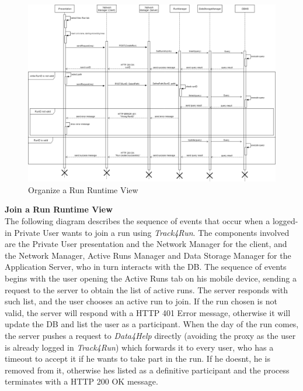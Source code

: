 \documentclass[titlepage]{article}
\begin{document}
	\begin{figure}[H]
		\center
		\includegraphics[width=15cm]{Organize.png}
		\caption{Organize a Run Runtime View}
		\label{fig:ORG}
	\end{figure}
	\noindent
	{\bf Join a Run Runtime View }\\ 
	The following diagram describes the sequence of events that occur when a logged-in Private User wants to join a run using {\it Track4Run}.
	The components involved are the Private User presentation and the Network Manager for the client, and the Network Manager, Active Runs Manager and Data Storage Manager for the Application Server, who in turn interacts with the DB.
	The sequence of events begins with the user opening the Active Runs tab on his mobile device, sending a request to the server to obtain the list of active runs. The server responds with such list, and the user chooses an active run to join. If the run chosen is not valid, the server will respond with a HTTP 401 Error message, otherwise it will update the DB and list the user as a participant.
	When the day of the run comes, the server pushes a request to {\it Data4Help} directly (avoiding the proxy as the user is already logged in {\it Track4Run}) which forwards it to every user, who has a timeout to accept it if he wants to take part in the run. If he doesn\textsc{}t, he is removed from it, otherwise he\textsc{}s listed as a definitive participant and the process terminates with a HTTP 200 OK message.
	
\end{document}
